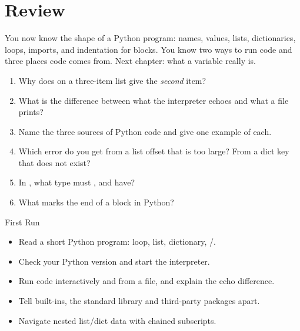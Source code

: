 \section{Review}

You now know the shape of a Python program: names, values, lists, dictionaries,
loops, imports, and indentation for blocks. You know two ways to run code and three
places code comes from. Next chapter: what a variable really is.

\begin{practice}
\begin{enumerate}[itemsep=1pt]
\item Why does  on a three-item list give the \emph{second} item?
\item What is the difference between what the interpreter echoes and what a file prints?
\item Name the three sources of Python code and give one example of each.
\item Which error do you get from a list offset that is too large? From a dict key that does not exist?
\item In , what type must ,  and  have?
\item What marks the end of a  block in Python?
\end{enumerate}
\end{practice}

\begin{achievement}{First Run}
\begin{itemize}[itemsep=1pt]
\item Read a short Python program: loop, list, dictionary, /.
\item Check your Python version and start the interpreter.
\item Run code interactively and from a  file, and explain the echo difference.
\item Tell built-ins, the standard library and third-party packages apart.
\item Navigate nested list/dict data with chained subscripts.
\end{itemize}
\end{achievement}
